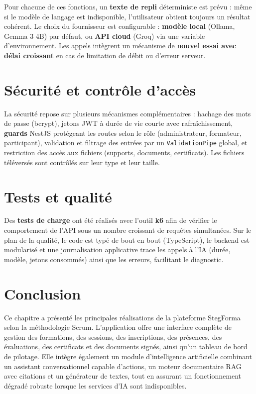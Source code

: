 \documentclass[12pt,a4paper]{report}
\begin{document}
Pour chacune de ces fonctions, un \textbf{texte de repli} déterministe est prévu : même si le modèle de langage est indisponible, l'utilisateur obtient toujours un résultat cohérent. Le choix du fournisseur est configurable : \textbf{modèle local} (Ollama, Gemma 3 4B) par défaut, ou \textbf{API cloud} (Groq) via une variable d'environnement. Les appels intègrent un mécanisme de \textbf{nouvel essai avec délai croissant} en cas de limitation de débit ou d'erreur serveur.

\section{Sécurité et contrôle d'accès}

La sécurité repose sur plusieurs mécanismes complémentaires : hachage des mots de passe (bcrypt), jetons JWT à durée de vie courte avec rafraîchissement, \textbf{guards} NestJS protégeant les routes selon le rôle (administrateur, formateur, participant), validation et filtrage des entrées par un \texttt{ValidationPipe} global, et restriction des accès aux fichiers (supports, documents, certificats). Les fichiers téléversés sont contrôlés sur leur type et leur taille.

\section{Tests et qualité}

Des \textbf{tests de charge} ont été réalisés avec l'outil \textbf{k6} afin de vérifier le comportement de l'API sous un nombre croissant de requêtes simultanées. Sur le plan de la qualité, le code est typé de bout en bout (TypeScript), le backend est modularisé et une journalisation applicative trace les appels à l'IA (durée, modèle, jetons consommés) ainsi que les erreurs, facilitant le diagnostic.

\enlargethispage{2cm}

\section*{Conclusion}
\hrulefill

Ce chapitre a présenté les principales réalisations de la plateforme StegForma selon la méthodologie Scrum. L'application offre une interface complète de gestion des formations, des sessions, des inscriptions, des présences, des évaluations, des certificats et des documents signés, ainsi qu'un tableau de bord de pilotage. Elle intègre également un module d'intelligence artificielle combinant un assistant conversationnel capable d'actions, un moteur documentaire RAG avec citations et un générateur de textes, tout en assurant un fonctionnement dégradé robuste lorsque les services d'IA sont indisponibles.
\end{document}
